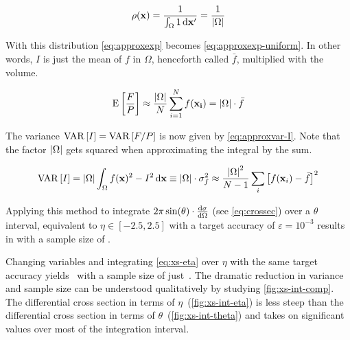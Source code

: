 \begin{equation}
  \label{eq:simplep}
  \rho(\vb{x}) = \frac{1}{\int_{\Omega}1\dd{\vb{x'}}} =
  \frac{1}{\abs{\Omega}}
\end{equation}

With this distribution \cref{eq:approxexp}
becomes \cref{eq:approxexp-uniform}. In other words, \(I\) is just
the mean of \(f\) in \(\Omega\), henceforth
called \(\bar{f}\), multiplied with the volume.

\begin{equation}
  \label{eq:approxexp-uniform}
  \operatorname{E}\qty[\frac{F}{P}] \approx
  \frac{\abs{\Omega}}{N}\sum_{i=1}^N f(\vb{x_i}) = \abs{\Omega}\cdot\bar{f}
\end{equation}

The variance \(\operatorname{VAR}\qty[I]=\operatorname{VAR}\qty[F/P]\) is now given
by \cref{eq:approxvar-I}. Note that the factor \(\abs{\Omega}\) gets
squared when approximating the integral by the sum.

\begin{equation}
  \label{eq:approxvar-I}
  \operatorname{VAR}\qty[I] = \abs{\Omega}\int_\Omega f(\vb{x})^2 -
  I^2 \dd{\vb{x}} \equiv \abs{\Omega}\cdot\sigma_f^2 \approx
  \frac{\abs{\Omega}^2}{N-1}\sum_{i}\qty[f(\vb{x}_i) - \bar{f}]^2
\end{equation}

Applying this method to integrate
\(2\pi\sin(\theta)\cdot\dv{\sigma}{\Omega}\) (see \cref{eq:crossec})
over a \(\theta\) interval, equivalent to \(\eta\in [-2.5, 2.5]\) with
a target accuracy of \(\varepsilon=10^{-3}\) results in
 with a sample size of
.

Changing variables and integrating \cref{eq:xs-eta} over \(\eta\)
with the same target accuracy yields~ with
a sample size of just~. The dramatic
reduction in variance and sample size can be understood qualitatively
by studying \cref{fig:xs-int-comp}. The differential cross section in
terms of \(\eta\)~(\cref{fig:xs-int-eta}) is less steep than the
differential cross section in terms of
\(\theta\)~(\cref{fig:xs-int-theta}) and takes on significant values
over most of the integration interval.

